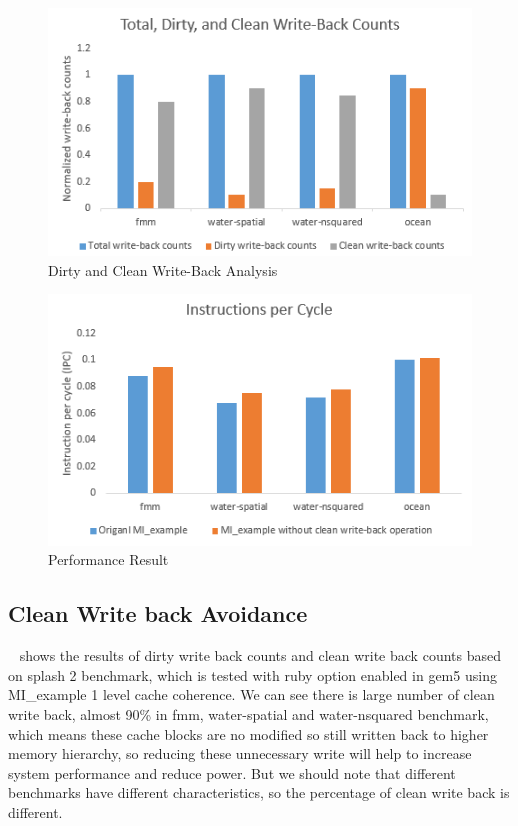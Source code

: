 
\begin{figure}[t]
\centering
\includegraphics[width=\columnwidth]{figs/cleancount}    
\caption{Dirty and Clean Write-Back Analysis}
\label{fig:cleancount}
\end{figure}


\begin{figure}[t]
\centering
\includegraphics[width=\columnwidth]{figs/ipc}    
\caption{Performance Result}
\label{fig:ipc}
\end{figure}



\subsection{Clean Write back Avoidance}
~ shows the results of dirty write back counts and clean write back counts based on splash 2 benchmark, which is tested with ruby option enabled in gem5 using MI\_example 1 level cache coherence. We can see there is large number of clean write back, almost 90\% in fmm, water-spatial and water-nsquared benchmark, which means these cache blocks are no modified so still written back to higher memory hierarchy, so reducing these unnecessary write will help to increase system performance and reduce power. But we should note that different benchmarks have different characteristics, so the percentage of clean write back is different.  

